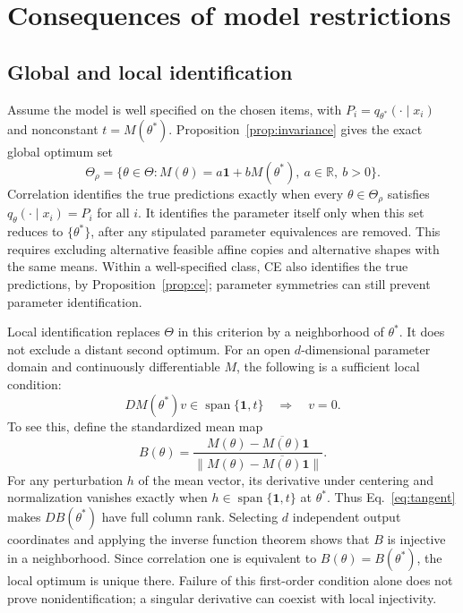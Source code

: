 \documentclass[11pt,letterpaper]{article}
\newcommand{\R}{\mathbb{R}}
\begin{document}
\section{Consequences of model restrictions}
\subsection{Global and local identification}
Assume the model is well specified on the chosen items, with $P_i=q_{\theta^\ast}(\cdot\mid x_i)$ and nonconstant $t=M(\theta^\ast)$.
Proposition~\ref{prop:invariance} gives the exact global optimum set
\begin{equation}\label{eq:thetaset}
 \Theta_\rho=\{\theta\in\Theta:M(\theta)=a\mathbf1+bM(\theta^\ast),\ a\in\R,\ b>0\}.
\end{equation}
Correlation identifies the true predictions exactly when every $\theta\in\Theta_\rho$ satisfies $q_\theta(\cdot\mid x_i)=P_i$ for all $i$.
It identifies the parameter itself only when this set reduces to $\{\theta^\ast\}$, after any stipulated parameter equivalences are removed.
This requires excluding alternative feasible affine copies and alternative shapes with the same means.
Within a well-specified class, CE also identifies the true predictions, by Proposition~\ref{prop:ce}; parameter symmetries can still prevent parameter identification.

Local identification replaces $\Theta$ in this criterion by a neighborhood of $\theta^\ast$.
It does not exclude a distant second optimum.
For an open $d$-dimensional parameter domain and continuously differentiable $M$, the following is a sufficient local condition:
\begin{equation}\label{eq:tangent}
 DM(\theta^\ast)v\in\operatorname{span}\{\mathbf1,t\}\quad\Longrightarrow\quad v=0.
\end{equation}
To see this, define the standardized mean map
\[
 B(\theta)=\frac{M(\theta)-\overline{M(\theta)}\mathbf1}{\|M(\theta)-\overline{M(\theta)}\mathbf1\|}.
\]
For any perturbation $h$ of the mean vector, its derivative under centering and normalization vanishes exactly when $h\in\operatorname{span}\{\mathbf1,t\}$ at $\theta^\ast$.
Thus Eq.~\eqref{eq:tangent} makes $DB(\theta^\ast)$ have full column rank.
Selecting $d$ independent output coordinates and applying the inverse function theorem shows that $B$ is injective in a neighborhood.
Since correlation one is equivalent to $B(\theta)=B(\theta^\ast)$, the local optimum is unique there.
Failure of this first-order condition alone does not prove nonidentification; a singular derivative can coexist with local injectivity.
\end{document}
